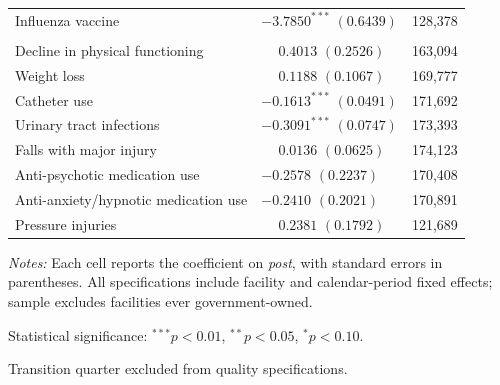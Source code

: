 \documentclass[11pt]{article}
\begin{document}
\begin{table}[!ht]
\begin{threeparttable}
\begin{tabularx}{\textwidth}{@{} l Y r @{}}
Influenza vaccine &  & 128,378 \\
\addlinespace[4pt]
 \\[2pt]
Decline in physical functioning &  & 163,094 \\
Weight loss &  & 169,777 \\
Catheter use &  & 171,692 \\
Urinary tract infections &  & 173,393 \\
Falls with major injury &  & 174,123 \\
Anti-psychotic medication use &  & 170,408 \\
Anti-anxiety/hypnotic medication use &  & 170,891 \\
Pressure injuries &  & 121,689 \\
\bottomrule
\end{tabularx}

\begin{tablenotes}[flushleft]
\footnotesize
\item \textit{Notes:} Each cell reports the coefficient on \textit{post}, with standard errors in parentheses. All specifications include facility and calendar-period fixed effects; sample excludes facilities ever government-owned.
\item Statistical significance: $^{***}p<0.01$, $^{**}p<0.05$, $^{*}p<0.10$.
\item Transition quarter excluded from quality specifications.
\end{tablenotes}
\end{threeparttable}
\end{table}
\end{document}
